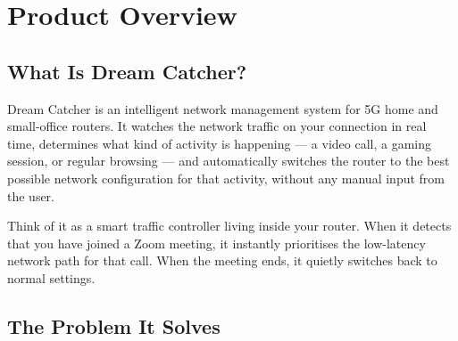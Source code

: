 \documentclass[11pt, a4paper]{article}
\begin{document}
\begin{titlepage}
\vfill


\end{titlepage}

\newpage
\thispagestyle{plain}

{\hypersetup{linkcolor=tmdark}
\tableofcontents}

\newpage

\section{Product Overview}

\subsection{What Is Dream Catcher?}

Dream Catcher is an intelligent network management system for 5G home and small-office routers. It watches the network traffic on your connection in real time, determines what kind of activity is happening — a video call, a gaming session, or regular browsing — and automatically switches the router to the best possible network configuration for that activity, without any manual input from the user.

Think of it as a smart traffic controller living inside your router. When it detects that you have joined a Zoom meeting, it instantly prioritises the low-latency network path for that call. When the meeting ends, it quietly switches back to normal settings.

\subsection{The Problem It Solves}
\end{document}
